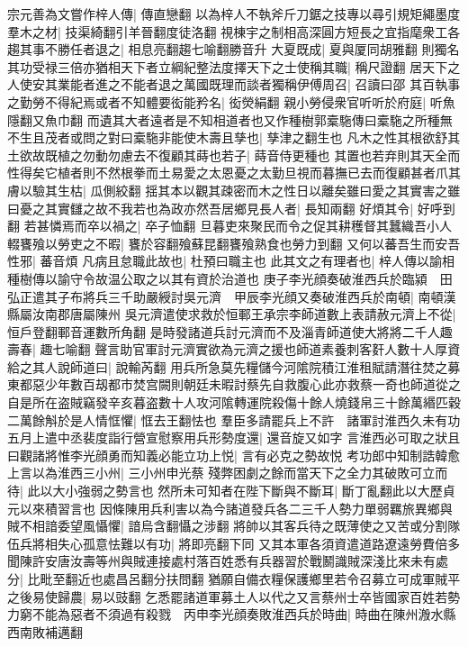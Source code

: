 宗元善為文嘗作梓人傳|{
	傳直戀翻}
以為梓人不執斧斤刀鋸之技專以尋引規矩繩墨度羣木之材|{
	技渠綺翻引羊晉翻度徒洛翻}
視棟宇之制相高深圓方短長之宜指麾衆工各趨其事不勝任者退之|{
	相息亮翻趨七喻翻勝音升}
大夏既成|{
	夏與厦同胡雅翻}
則獨名其功受禄三倍亦猶相天下者立綱紀整法度擇天下之士使稱其職|{
	稱尺證翻}
居天下之人使安其業能者進之不能者退之萬國既理而談者獨稱伊傅周召|{
	召讀曰邵}
其百執事之勤勞不得紀焉或者不知體要衒能矜名|{
	衒熒絹翻}
親小勞侵衆官听听於府庭|{
	听魚隱翻又魚巾翻}
而遺其大者遠者是不知相道者也又作種樹郭槖駞傳曰槖駞之所種無不生且茂者或問之對曰槖駞非能使木壽且孳也|{
	孳津之翻生也}
凡木之性其根欲舒其土欲故既植之勿動勿慮去不復顧其蒔也若子|{
	蒔音侍更種也}
其置也若弃則其天全而性得矣它植者則不然根拳而土易愛之太恩憂之太勤旦視而暮撫已去而復顧甚者爪其膚以驗其生枯|{
	瓜側絞翻}
揺其本以觀其疎密而木之性日以離矣雖曰愛之其實害之雖曰憂之其實讎之故不我若也為政亦然吾居鄉見長人者|{
	長知兩翻}
好煩其令|{
	好呼到翻}
若甚憐焉而卒以禍之|{
	卒子恤翻}
旦暮吏來聚民而令之促其耕穫督其蠶織吾小人輟饔飱以勞吏之不暇|{
	饔於容翻飱蘇昆翻饔飱熟食也勞力到翻}
又何以蕃吾生而安吾性邪|{
	蕃音煩}
凡病且怠職此故也|{
	杜預曰職主也}
此其文之有理者也|{
	梓人傳以諭相種樹傳以諭守令故温公取之以其有資於治道也}
庚子李光顔奏破淮西兵於臨潁　田弘正遣其子布將兵三千助嚴綬討吳元濟　甲辰李光顔又奏破淮西兵於南頓|{
	南頓漢縣屬汝南郡唐屬陳州}
吳元濟遣使求救於恒鄆王承宗李師道數上表請赦元濟上不從|{
	恒戶登翻鄆音運數所角翻}
是時發諸道兵討元濟而不及淄青師道使大將將二千人趣壽春|{
	趣七喻翻}
聲言助官軍討元濟實欲為元濟之援也師道素養刺客姧人數十人厚資給之其人說師道曰|{
	說輸芮翻}
用兵所急莫先糧儲今河隂院積江淮租賦請潛往焚之募東都惡少年數百刼都市焚宫闕則朝廷未暇討蔡先自救腹心此亦救蔡一奇也師道從之自是所在盗賊竊發辛亥暮盗數十人攻河隂轉運院殺傷十餘人燒錢帛三十餘萬緡匹穀二萬餘斛於是人情恇懼|{
	恇去王翻怯也}
羣臣多請罷兵上不許　諸軍討淮西久未有功五月上遣中丞裴度詣行營宣慰察用兵形勢度還|{
	還音旋又如字}
言淮西必可取之狀且曰觀諸將惟李光顔勇而知義必能立功上悦|{
	言有必克之勢故悦}
考功郎中知制誥韓愈上言以為淮西三小州|{
	三小州申光蔡}
殘弊困劇之餘而當天下之全力其破敗可立而待|{
	此以大小強弱之勢言也}
然所未可知者在陛下斷與不斷耳|{
	斷丁亂翻此以大歷貞元以來積習言也}
因條陳用兵利害以為今諸道發兵各二三千人勢力單弱羈旅異鄉與賊不相諳委望風懾懼|{
	諳烏含翻懾之涉翻}
將帥以其客兵待之既薄使之又苦或分割隊伍兵將相失心孤意怯難以有功|{
	將即亮翻下同}
又其本軍各須資遣道路遼遠勞費倍多聞陳許安唐汝壽等州與賊連接處村落百姓悉有兵器習於戰鬭識賊深淺比來未有處分|{
	比毗至翻近也處昌呂翻分扶問翻}
猶願自備衣糧保護鄉里若令召募立可成軍賊平之後易使歸農|{
	易以豉翻}
乞悉罷諸道軍募土人以代之又言蔡州士卒皆國家百姓若勢力窮不能為惡者不須過有殺戮　丙申李光顔奏敗淮西兵於時曲|{
	時曲在陳州溵水縣西南敗補邁翻}
